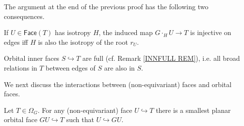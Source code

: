 \documentclass[a4paper,10pt
 ,draft
]{article}%
\begin{document}
The argument at the end of the previous proof has the following two consequences.

\begin{remark}\label{ROOTISOMONO REM}
	If $U \in \mathsf{Face}(T)$ has isotropy $H$,
	the induced map 
	$G \cdot_H U \to T$ is injective on edges iff
	$H$ is also the isotropy of the root $r_U$.
\end{remark}

\begin{remark}\label{INNFULLORB REM}
	Orbital inner faces $S \hookrightarrow T$ are full (cf. Remark \ref{INNFULL REM}), i.e. all broad relations in $T$ between edges of $S$ are also in $S$. 
\end{remark}

We next discuss the interactions between (non-equivariant) faces and orbital faces.

\begin{proposition}\label{MINGFACT PROP}
	Let $T \in \Omega_G$.
	For any (non-equivariant) face $U \hookrightarrow T$ 
	there is a smallest planar orbital face $GU \hookrightarrow T$
	such that $U \hookrightarrow GU$. 
\end{proposition}
\end{document}
